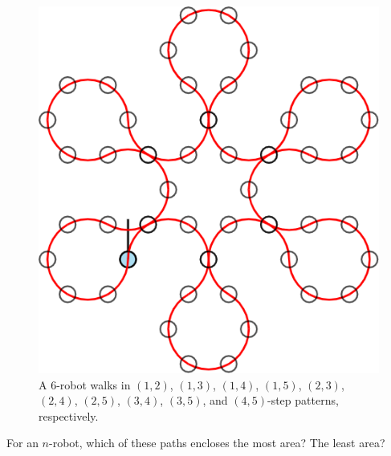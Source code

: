 \documentclass{article}
\begin{document}
\begin{figure}[ht!]
  \includegraphics[scale=0.12]{assets/069_problem_robot_walks/6-robot_4_5.png}
  \caption{
    A $6$-robot walks in $(1,2)$, $(1,3)$, $(1,4)$, $(1,5)$, $(2,3)$,
    $(2,4)$, $(2,5)$, $(3,4)$, $(3,5)$, and $(4,5)$-step patterns, respectively.
  }
\end{figure}
\begin{question}
  For an $n$-robot, which of these paths encloses the most area? The least area?
\end{question}
\end{document}
